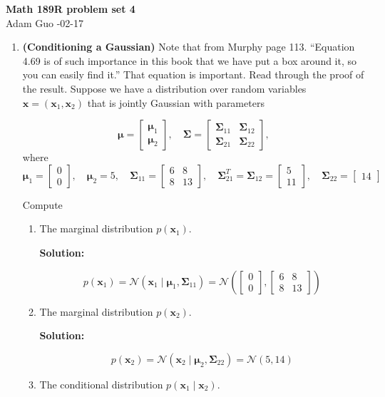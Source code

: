 \documentclass[letter,11pt]{article}
\newenvironment{solution}{
    \vspace{0.16in} {\bf Solution:}
    
}{
	\vspace{0.16in}
}
\newcommand{\xx}{\bm{x}}
\newcommand{\mub}{\bm{\mu}}
\newcommand{\Sigmab}{\bm{\Sigma}}
\newcommand{\m}[1]{\begin{bmatrix}#1\end{bmatrix}}
\newcommand{\N}{\mathcal{N}}
\begin{document}
\begin{center}
    {\bf \Large Math 189R problem set 4} \\
    \vspace{0.1in}
    Adam Guo -02-17
\end{center}

\begin{enumerate}
    \item \textbf{(Conditioning a Gaussian)} Note that from Murphy page 113.
    ``Equation 4.69 is of such importance in this book that we have put a box
    around it, so you can easily find it.'' That equation is important. Read
    through the proof of the result. Suppose we have a distribution over random
    variables $\xx = (\xx_1, \xx_2)$ that is jointly Gaussian with parameters

    \[\mub = \m{\mub_1 \\ \mub_2}, \quad
    \Sigmab = \m{\Sigmab_{11} & \Sigmab_{12} \\ \Sigmab_{21} & \Sigmab_{22}},\]
    where
    \[\mub_1 = \m{0 \\ 0}, \quad
    \mub_2 = 5, \quad
    \Sigmab_{11} = \m{6 & 8 \\ 8 & 13}, \quad
    \Sigmab_{21}^T = \Sigmab_{12} = \m{5 \\ 11}, \quad
    \Sigmab_{22} = \m{14}\]

    Compute
    \begin{enumerate}[label=(\alph*)]
        \item The marginal distribution $p(\xx_1)$.

        \begin{solution}
            \[p(\xx_1) = \N(\xx_1 \mid \mub_1, \Sigmab_{11})
            = \N\left(\m{0 \\ 0}, \m{6 & 8 \\ 8 & 13}\right)\]
        \end{solution}


        \item The marginal distribution $p(\xx_2)$.
        
        \begin{solution}
            \[p(\xx_2) = \N(\xx_2 \mid \mub_2, \Sigmab_{22}) = \N(5, 14)\]
        \end{solution}


        \item The conditional distribution $p(\xx_1 \mid \xx_2)$.
        

\end{enumerate}
\end{enumerate}
\end{document}

